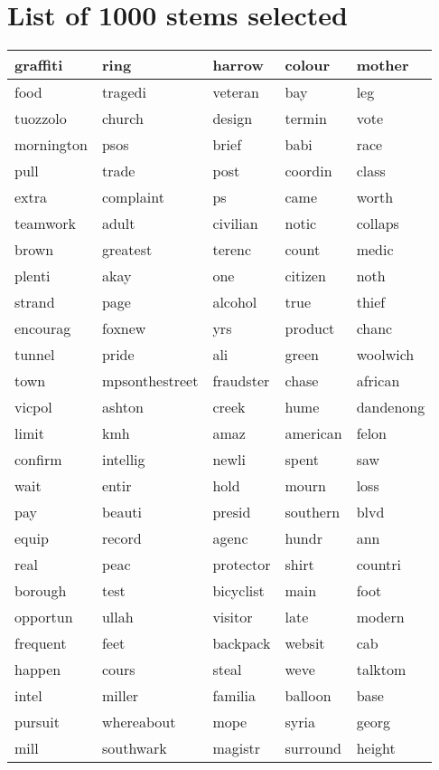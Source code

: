 \chapter{List of 1000 stems selected}\label{1000_stems}

\begin{longtable}{p{2.5cm}p{2.5cm}p{2.5cm}p{2.5cm}p{2.5cm}}
graffiti&ring&harrow&colour&mother\\ \hline 
food&tragedi&veteran&bay&leg\\ \hline 
tuozzolo&church&design&termin&vote\\ \hline 
mornington&psos&brief&babi&race\\ \hline 
pull&trade&post&coordin&class\\ \hline 
extra&complaint&ps&came&worth\\ \hline 
teamwork&adult&civilian&notic&collaps\\ \hline 
brown&greatest&terenc&count&medic\\ \hline 
plenti&akay&one&citizen&noth\\ \hline 
strand&page&alcohol&true&thief\\ \hline 
encourag&foxnew&yrs&product&chanc\\ \hline 
tunnel&pride&ali&green&woolwich\\ \hline 
town&mpsonthestreet&fraudster&chase&african\\ \hline 
vicpol&ashton&creek&hume&dandenong\\ \hline 
limit&kmh&amaz&american&felon\\ \hline 
confirm&intellig&newli&spent&saw\\ \hline 
wait&entir&hold&mourn&loss\\ \hline 
pay&beauti&presid&southern&blvd\\ \hline 
equip&record&agenc&hundr&ann\\ \hline 
real&peac&protector&shirt&countri\\ \hline 
borough&test&bicyclist&main&foot\\ \hline 
opportun&ullah&visitor&late&modern\\ \hline 
frequent&feet&backpack&websit&cab\\ \hline 
happen&cours&steal&weve&talktom\\ \hline 
intel&miller&familia&balloon&base\\ \hline 
pursuit&whereabout&mope&syria&georg\\ \hline 
mill&southwark&magistr&surround&height\\ \hline 

\end{longtable}
